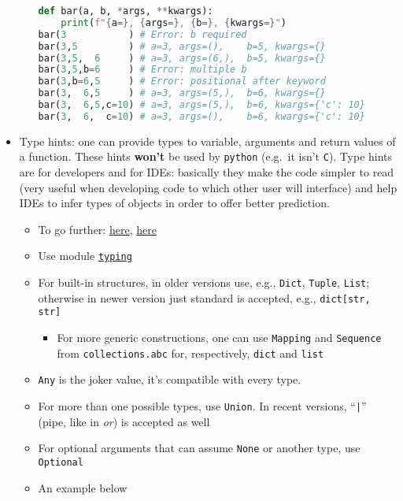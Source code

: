\documentclass[a4paper,12pt,%
              final%
              ]{article}
\begin{document}
\begin{itemize}
\begin{itemize}
\begin{lstlisting}[language=python]
def bar(a, b, *args, **kwargs):
    print(f"{a=}, {args=}, {b=}, {kwargs=}")
bar(3           ) # Error: b required
bar(3,5         ) # a=3, args=(),    b=5, kwargs={}
bar(3,5,  6     ) # a=3, args=(6,),  b=5, kwargs={}
bar(3,5,b=6     ) # Error: multiple b
bar(3,b=6,5     ) # Error: positional after keyword
bar(3,  6,5     ) # a=3, args=(5,),  b=6, kwargs={}
bar(3,  6,5,c=10) # a=3, args=(5,),  b=6, kwargs={'c': 10}
bar(3,  6,  c=10) # a=3, args=(),    b=6, kwargs={'c': 10}
\end{lstlisting}
    \end{itemize}
  \item Type hints: one can provide types to variable, arguments and return values of a function. These hints \textbf{won't} be used by \texttt{python} (e.g.\ it isn't \texttt{C}). Type hints are for developers and for IDEs: basically they make the code simpler to read (very useful when developing code to which other user will interface) and help IDEs to infer types of objects in order to offer better prediction.
    \begin{itemize}
      \item To go further: \href{https://stackoverflow.com/a/32558710}{here}, \href{https://www.infoworld.com/article/3630372/get-started-with-python-type-hints.html}{here}
      \item Use module \href{https://docs.python.org/3/library/typing.html}{\texttt{typing}}
      \item For built-in structures, in older versions use, e.g., \texttt{Dict}, \texttt{Tuple}, \texttt{List}; otherwise in newer version just standard is accepted, e.g., \verb|dict[str, str]|
        \begin{itemize}
          \item For more generic constructions, one can use \texttt{Mapping} and \texttt{Sequence} from \texttt{collections.abc} for, respectively, \texttt{dict} and \texttt{list}
        \end{itemize}
      \item \texttt{Any} is the joker value, it's compatible with every type.
      \item For more than one possible types, use \verb|Union|. In recent versions, ``\verb!|!'' (pipe, like in \emph{or}) is accepted as well
      \item For optional arguments that can assume \verb|None| or another type, use \verb|Optional|
      \item An example below
\begin{lstlisting}[language=python]

\end{lstlisting}
\end{itemize}
\end{itemize}
\end{document}
